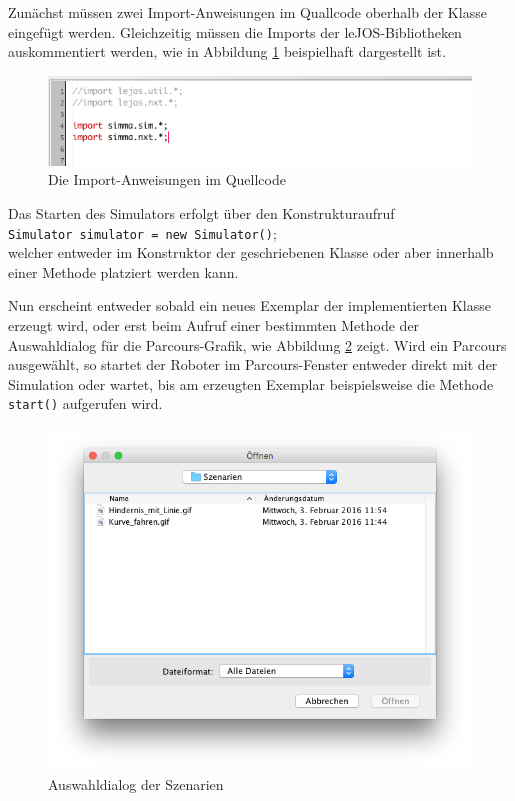 \documentclass[paper=a4, DIV=calc, BCOR=12mm, twoside=on, onecolumn=on, open = right, titlepage =on, parskip =half-, headsepline = on, footsepline = off, chapterprefix = off, appendixprefix = on, fontsize = 12pt, numbers = noenddot, abstract = on]{scrbook}
\begin{document}
Zunächst müssen zwei Import-Anweisungen im Quallcode oberhalb der Klasse eingefügt werden. Gleichzeitig müssen die Imports der leJOS-Bibliotheken auskommentiert werden, wie in Abbildung \ref{fig:import} beispielhaft dargestellt ist.

\begin{figure}[htbp]
\centering
\includegraphics[width=\textwidth]{images/Anleitung_Import.png}
\caption{Die Import-Anweisungen im Quellcode}
\label{fig:import}
\end{figure}


Das Starten des Simulators erfolgt über den Konstrukturaufruf\\
\hspace*{2ex} \texttt{Simulator simulator = new Simulator()};\\
welcher entweder im Konstruktor der geschriebenen Klasse oder aber innerhalb einer Methode platziert werden kann.

Nun erscheint entweder sobald ein neues Exemplar der implementierten Klasse erzeugt wird, oder erst beim Aufruf einer bestimmten Methode der Auswahldialog für die Parcours-Grafik, wie Abbildung \ref{fig:auswahl_szenarien} zeigt. Wird ein Parcours ausgewählt, so startet der Roboter im Parcours-Fenster entweder direkt mit der Simulation oder wartet, bis am erzeugten Exemplar beispielsweise die Methode \texttt{start()} aufgerufen wird.

\begin{figure}[htbp]
\centering
\includegraphics[width=\textwidth]{images/dialog_szenarien.png}
\caption{Auswahldialog der Szenarien}
\label{fig:auswahl_szenarien}
\end{figure}
\end{document}
